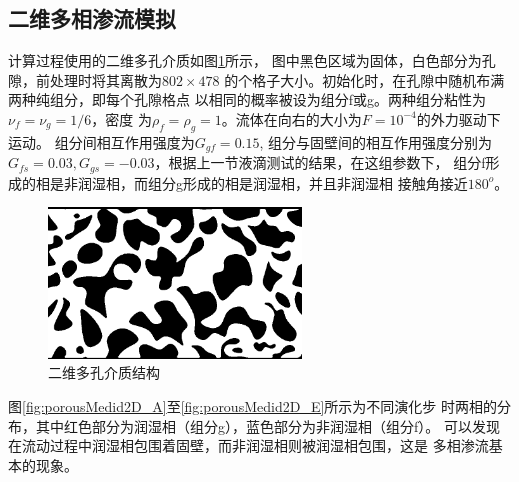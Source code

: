 \subsection{二维多相渗流模拟}
计算过程使用的二维多孔介质如图\ref{fig:porousMedid2D}所示，
图中黑色区域为固体，白色部分为孔隙，前处理时将其离散为$802\times478$
的个格子大小。初始化时，在孔隙中随机布满两种纯组分，即每个孔隙格点
以相同的概率被设为组分f或g。两种组分粘性为$\nu_f=\nu_g=1/6$，密度
为$\rho_f=\rho_g=1$。流体在向右的大小为$F=10^{-4}$的外力驱动下运动。
组分间相互作用强度为$G_{gf}=0.15$, 组分与固壁间的相互作用强度分别为
$G_{fs}=0.03,G_{gs}=-0.03$，根据上一节液滴测试的结果，在这组参数下，
组分f形成的相是非润湿相，而组分g形成的相是润湿相，并且非润湿相
接触角接近$180^o$。
\begin{figure}[htb]
  \centering
  \includegraphics[width=0.6\textwidth]{img/porousMedia2D}
  \caption{二维多孔介质结构}
  \label{fig:porousMedid2D}
\end{figure}
图\ref{fig:porousMedid2D_A}至\ref{fig:porousMedid2D_E}所示为不同演化步
时两相的分布，其中红色部分为润湿相（组分g），蓝色部分为非润湿相（组分f）。
可以发现在流动过程中润湿相包围着固壁，而非润湿相则被润湿相包围，这是
多相渗流基本的现象。
